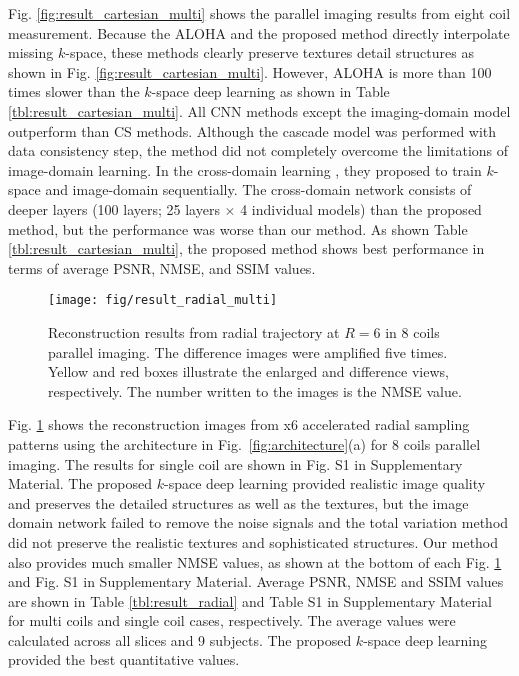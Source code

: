 \documentclass[10pt,journal]{IEEEtran}
\newcommand{\0}{{\boldsymbol{0}}}
\begin{document}
 Fig. \ref{fig:result_cartesian_multi} shows the parallel imaging results from  eight coil measurement. 
Because the ALOHA \cite{jin2016general} and the proposed method directly interpolate missing $k$-space, these methods clearly preserve textures detail structures as shown in  Fig. \ref{fig:result_cartesian_multi}. However, ALOHA \cite{jin2016general} is more than 100 times slower than the $k$-space deep learning as shown in Table \ref{tbl:result_cartesian_multi}.  
All CNN methods except the imaging-domain model outperform than CS methods. Although the cascade model \cite{schlemper2018deep} was performed with data consistency step, the method did not completely
overcome the limitations of image-domain learning. In the cross-domain learning \cite{eo2018kiki}, they proposed to train $k$-space and image-domain sequentially. 
The cross-domain network consists of deeper layers (100 layers; 25 layers $\times$ 4 individual models) than the proposed method, 
but the performance was worse than our method. As shown Table \ref{tbl:result_cartesian_multi},
the proposed method shows best performance in terms of average PSNR, NMSE, and SSIM values.


 
\begin{figure}[!t] 	
\centering
\centerline{\texttt{[image: fig/result\_radial\_multi]}}
\caption{Reconstruction results from radial trajectory at $R=6$ in 8 coils parallel imaging. The difference images were amplified five times. Yellow and red boxes illustrate the enlarged and difference views, respectively.  The number written to the images is the NMSE value.}
\label{fig:result_radial}
\end{figure}
 
 

Fig. \ref{fig:result_radial} shows the reconstruction images from x6 accelerated radial sampling patterns using the architecture in Fig.~\ref{fig:architecture}(a) for 8 coils parallel imaging. The results for single coil are shown in Fig. S1 in Supplementary Material. 
The proposed $k$-space deep learning provided realistic image quality and preserves the detailed structures as well as the textures, but the image domain network failed to remove the noise signals and the total variation method did not preserve the realistic textures and sophisticated structures. Our method also provides much smaller NMSE values, as shown at the bottom of each Fig. \ref{fig:result_radial}  and Fig. S1 in Supplementary Material. Average PSNR, NMSE and SSIM values are shown in Table \ref{tbl:result_radial} and Table S1 in Supplementary Material for multi coils and single coil cases, respectively. The average values were calculated across all slices and 9 subjects. The proposed $k$-space deep learning provided the best quantitative values. 
\end{document}

